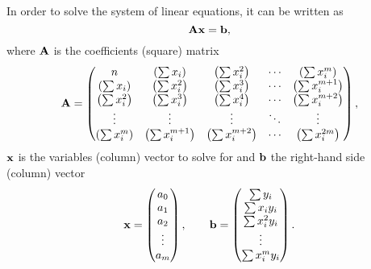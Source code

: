 In order to solve the system of linear equations, it can be written as 
\begin{equation}\label{eq:ecuacion_sistema_matricial}
    \boldsymbol{\mathrm{A}} \boldsymbol{\mathrm{x}} = \boldsymbol{\mathrm{b}},
\end{equation}
where $\boldsymbol{\mathrm{A}}$ is the coefficients (square) matrix
\begin{equation}
    \boldsymbol{\mathrm{A}} = 
    \begin{pmatrix}
        n                           & \left( \sum x_i  \right)        & \left( \sum x_i^2  \right)        & \cdots & \left( \sum x_i^m  \right)      \\
        \left( \sum x_i  \right)    & \left( \sum x_i^{2}  \right)    & \left( \sum x_i^3  \right)        & \cdots & \left( \sum x_i^{m+1}  \right)  \\
        \left( \sum x_i^2  \right)  & \left( \sum x_i^{3}  \right)    & \left( \sum x_i^4  \right)        & \cdots & \left( \sum x_i^{m+2}  \right)  \\
        \vdots & \vdots & \vdots &  \ddots & \vdots \\
        \left( \sum x_i^m  \right)  & \left( \sum x_i^{m+1}  \right)  & \left( \sum x_i^{m + 2}  \right)  & \cdots & \left( \sum x_i^{2m}  \right)   \\
    \end{pmatrix},
\end{equation}
$\boldsymbol{\mathrm{x}}$ is the variables (column) vector to solve for and $\boldsymbol{\mathrm{b}}$ the
right-hand side (column) vector
\begin{equation}
    \boldsymbol{\mathrm{x}} =
    \begin{pmatrix}
        a_0 \\
        a_1 \\
        a_2 \\
        \vdots \\
        a_m \\
    \end{pmatrix}, \qquad
    \boldsymbol{\mathrm{b}} =
    \begin{pmatrix}
        \sum y_i        \\
        \sum x_i y_i    \\
        \sum x_i^2 y_i  \\
        \vdots \\
        \sum x_i^m y_i \\
    \end{pmatrix}.
\end{equation}

